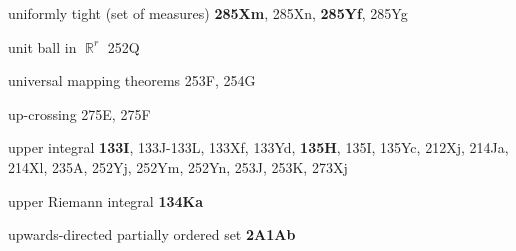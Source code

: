 uniformly tight 
(set of measures) {\bf 285Xm}, 285Xn, {\bf 285Yf}, 285Yg









unit ball in $\BbbR^r$ 252Q












universal mapping theorems 253F, 254G
































up-crossing 275E, 275F
















upper integral {\bf 133I}, 133J-133L, 
133Xf, 133Yd, {\bf 135H}, 135I, 135Yc,
  212Xj, 214Ja, 214Xl, 235A, 252Yj, 252Ym, 252Yn, 253J, 253K, 273Xj

upper Riemann integral {\bf 134Ka}













upwards-directed partially ordered set
{\bf 2A1Ab}

















